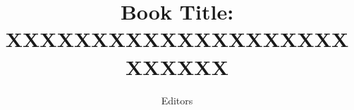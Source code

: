 \documentclass{book}
\begin{document}
\title{Book Title: XXXXXXXXXXXXXXXXXXXXXXXXXX}
\author{Editors}


\maketitle

\doublespace \frontmatter \tableofcontents \mainmatter
{}



%

%
%
\end{document}
